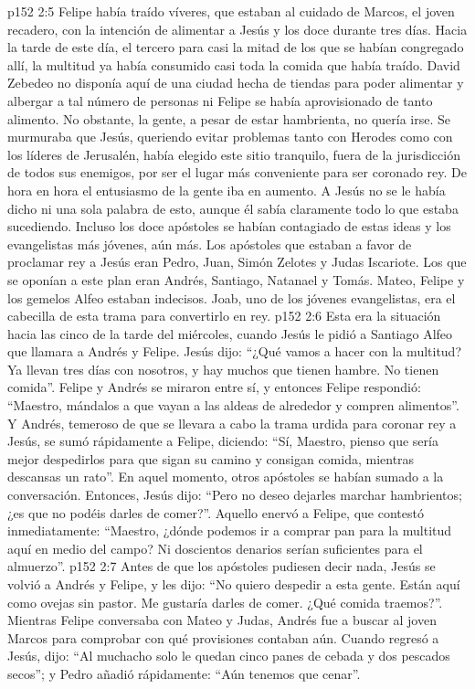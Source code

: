 \vs p152 2:5 \pc Felipe había traído víveres, que estaban al cuidado de Marcos, el joven recadero, con la intención de alimentar a Jesús y los doce durante tres días. Hacia la tarde de este día, el tercero para casi la mitad de los que se habían congregado allí, la multitud ya había consumido casi toda la comida que había traído. David Zebedeo no disponía aquí de una ciudad hecha de tiendas para poder alimentar y albergar a tal número de personas ni Felipe se había aprovisionado de tanto alimento. No obstante, la gente, a pesar de estar hambrienta, no quería irse. Se murmuraba que Jesús, queriendo evitar problemas tanto con Herodes como con los líderes de Jerusalén, había elegido este sitio tranquilo, fuera de la jurisdicción de todos sus enemigos, por ser el lugar más conveniente para ser coronado rey. De hora en hora el entusiasmo de la gente iba en aumento. A Jesús no se le había dicho ni una sola palabra de esto, aunque él sabía claramente todo lo que estaba sucediendo. Incluso los doce apóstoles se habían contagiado de estas ideas y los evangelistas más jóvenes, aún más. Los apóstoles que estaban a favor de proclamar rey a Jesús eran Pedro, Juan, Simón Zelotes y Judas Iscariote. Los que se oponían a este plan eran Andrés, Santiago, Natanael y Tomás. Mateo, Felipe y los gemelos Alfeo estaban indecisos. Joab, uno de los jóvenes evangelistas, era el cabecilla de esta trama para convertirlo en rey.
\vs p152 2:6 \pc Esta era la situación hacia las cinco de la tarde del miércoles, cuando Jesús le pidió a Santiago Alfeo que llamara a Andrés y Felipe. Jesús dijo: “¿Qué vamos a hacer con la multitud? Ya llevan tres días con nosotros, y hay muchos que tienen hambre. No tienen comida”. Felipe y Andrés se miraron entre sí, y entonces Felipe respondió: “Maestro, mándalos a que vayan a las aldeas de alrededor y compren alimentos”. Y Andrés, temeroso de que se llevara a cabo la trama urdida para coronar rey a Jesús, se sumó rápidamente a Felipe, diciendo: “Sí, Maestro, pienso que sería mejor despedirlos para que sigan su camino y consigan comida, mientras descansas un rato”. En aquel momento, otros apóstoles se habían sumado a la conversación. Entonces, Jesús dijo: “Pero no deseo dejarles marchar hambrientos; ¿es que no podéis darles de comer?”. Aquello enervó a Felipe, que contestó inmediatamente: “Maestro, ¿dónde podemos ir a comprar pan para la multitud aquí en medio del campo? Ni doscientos denarios serían suficientes para el almuerzo”.
\vs p152 2:7 Antes de que los apóstoles pudiesen decir nada, Jesús se volvió a Andrés y Felipe, y les dijo: “No quiero despedir a esta gente. Están aquí como ovejas sin pastor. Me gustaría darles de comer. ¿Qué comida traemos?”. Mientras Felipe conversaba con Mateo y Judas, Andrés fue a buscar al joven Marcos para comprobar con qué provisiones contaban aún. Cuando regresó a Jesús, dijo: “Al muchacho solo le quedan cinco panes de cebada y dos pescados secos”; y Pedro añadió rápidamente: “Aún tenemos que cenar”.
